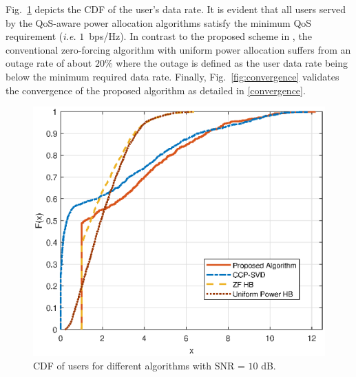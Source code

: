 \documentclass[10pt,journal,twocolumn,twoside]{IEEEtran}
\begin{document}
Fig.~\ref{fig:cdf} depicts the CDF of the user's data rate. It is evident that all users served by the QoS-aware power allocation algorithms satisfy the minimum QoS requirement (\textit{i.e.} $1$~bps/Hz). In contrast to the proposed scheme in \cite{alkhateeb2014channel}, the conventional zero-forcing algorithm with uniform power allocation suffers from an outage rate of about $20\%$ where the outage is defined as the user data rate being below the minimum required data rate. Finally, Fig.~\ref{fig:convergence} validates the convergence of the proposed algorithm as detailed in \ref{convergence}.
\begin{figure}[ht]
	\begin{center}
		\includegraphics[scale=0.66]{Figure/cdf12users.eps}
		\caption{CDF of users for different algorithms with SNR = $10$ dB.}\label{fig:cdf}
	\end{center}
\end{figure}
\end{document}
